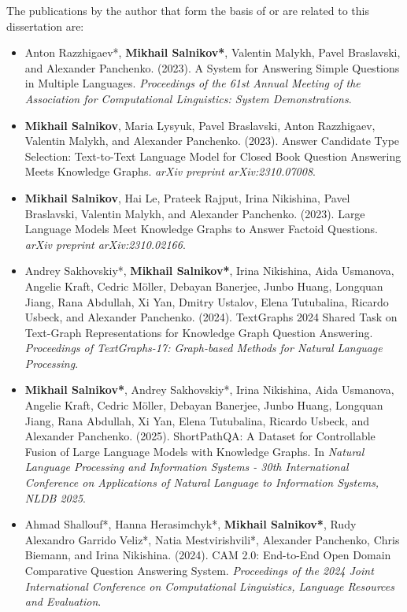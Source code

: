 The publications by the author that form the basis of or are related to this dissertation are:
\begin{itemize}
    \item Anton Razzhigaev*, \textbf{Mikhail Salnikov*}, Valentin Malykh, Pavel Braslavski, and Alexander Panchenko. (2023). A System for Answering Simple Questions in Multiple Languages. \textit{Proceedings of the 61st Annual Meeting of the Association for Computational Linguistics: System Demonstrations}.
    \item \textbf{Mikhail Salnikov}, Maria Lysyuk, Pavel Braslavski, Anton Razzhigaev, Valentin Malykh, and Alexander Panchenko. (2023). Answer Candidate Type Selection: Text-to-Text Language Model for Closed Book Question Answering Meets Knowledge Graphs. \textit{arXiv preprint arXiv:2310.07008}.
    \item \textbf{Mikhail Salnikov}, Hai Le, Prateek Rajput, Irina Nikishina, Pavel Braslavski, Valentin Malykh, and Alexander Panchenko. (2023). Large Language Models Meet Knowledge Graphs to Answer Factoid Questions. \textit{arXiv preprint arXiv:2310.02166}.
    \item Andrey Sakhovskiy*, \textbf{Mikhail Salnikov*}, Irina Nikishina, Aida Usmanova, Angelie Kraft, Cedric Möller, Debayan Banerjee, Junbo Huang, Longquan Jiang, Rana Abdullah, Xi Yan, Dmitry Ustalov, Elena Tutubalina, Ricardo Usbeck, and Alexander Panchenko. (2024). TextGraphs 2024 Shared Task on Text-Graph Representations for Knowledge Graph Question Answering. \textit{Proceedings of TextGraphs-17: Graph-based Methods for Natural Language Processing}.
    \item \textbf{Mikhail Salnikov*}, Andrey Sakhovskiy*, Irina Nikishina, Aida Usmanova, Angelie Kraft, Cedric Möller, Debayan Banerjee, Junbo Huang, Longquan Jiang, Rana Abdullah, Xi Yan, Elena Tutubalina, Ricardo Usbeck, and Alexander Panchenko. (2025). ShortPathQA: A Dataset for Controllable Fusion of Large Language Models with Knowledge Graphs. In \textit{Natural Language Processing and Information Systems - 30th International Conference on Applications of Natural Language to Information Systems, NLDB 2025}.
    \item Ahmad Shallouf*, Hanna Herasimchyk*, \textbf{Mikhail Salnikov*}, Rudy Alexandro Garrido Veliz*, Natia Mestvirishvili*, Alexander Panchenko, Chris Biemann, and Irina Nikishina. (2024). CAM 2.0: End-to-End Open Domain Comparative Question Answering System. \textit{Proceedings of the 2024 Joint International Conference on Computational Linguistics, Language Resources and Evaluation}.

\end{itemize}

